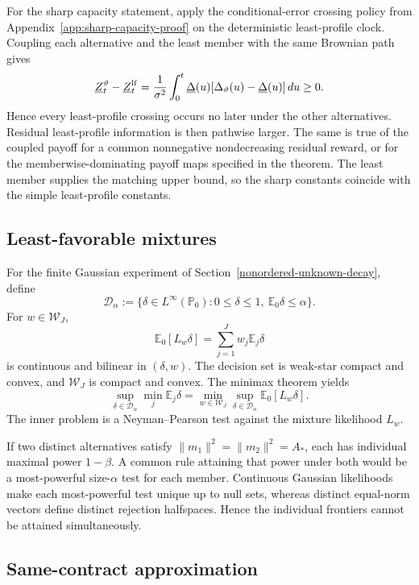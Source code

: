 \documentclass[11pt]{article}
\numberwithin{equation}{section}
\theoremstyle{plain}
\theoremstyle{definition}
\theoremstyle{remark}
\newcommand{\Pzero}{\mathbb P_0}
\newcommand{\Ezero}{\mathbb E_0}
\begin{document}
For the sharp capacity statement, apply the conditional-error crossing policy from Appendix~\ref{app:sharp-capacity-proof} on the deterministic least-profile clock.  Coupling each alternative and the least member with the same Brownian path gives
\[
\underline Z_t^{\vartheta}-\underline Z_t^{\rm lf}
=
\frac1{\sigma^2}\int_0^t
\underline\Delta(u)[\Delta_\vartheta(u)-\underline\Delta(u)]\,du
\ge0.
\]
Hence every least-profile crossing occurs no later under the other alternatives. Residual least-profile information is then pathwise larger. The same is true of the coupled payoff for a common nonnegative nondecreasing residual reward, or for the memberwise-dominating payoff maps specified in the theorem. The least member supplies the matching upper bound, so the sharp constants coincide with the simple least-profile constants.

\subsection{Least-favorable mixtures}

For the finite Gaussian experiment of Section~\ref{nonordered-unknown-decay}, define
\[
\mathcal D_\alpha
:=
\{\delta\in L^\infty(\Pzero):0\le\delta\le1,\ \Ezero\delta\le\alpha\}.
\]
For $w\in\mathcal W_J$,
\[
\Ezero[L_w\delta]=\sum_{j=1}^J w_j\mathbb E_j\delta
\]
is continuous and bilinear in $(\delta,w)$.  The decision set is weak-star compact and convex, and $\mathcal W_J$ is compact and convex.  The minimax theorem yields
\[
\sup_{\delta\in\mathcal D_\alpha}\min_j\mathbb E_j\delta
=
\min_{w\in\mathcal W_J}\sup_{\delta\in\mathcal D_\alpha}\Ezero[L_w\delta].
\]
The inner problem is a Neyman--Pearson test against the mixture likelihood $L_w$.

If two distinct alternatives satisfy $\|m_1\|^2=\|m_2\|^2=A_*$, each has individual maximal power $1-\beta$.  A common rule attaining that power under both would be a most-powerful size-$\alpha$ test for each member.  Continuous Gaussian likelihoods make each most-powerful test unique up to null sets, whereas distinct equal-norm vectors define distinct rejection halfspaces.  Hence the individual frontiers cannot be attained simultaneously.

\subsection{Same-contract approximation}
\end{document}
